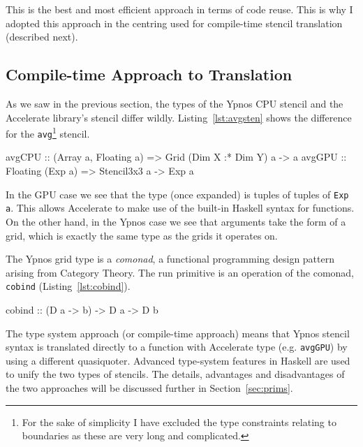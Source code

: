 \documentclass[
    12pt,
    a4paper,
    twoside,
    openright,
    ]{scrbook}
\begin{document}
This is the best and most efficient approach in terms of code reuse. This is why
I adopted this approach in the centring used for compile-time stencil
translation (described next).

\subsection{Compile-time Approach to Translation}
\label{sec:typesysapp}

As we saw in the previous section, the types of the Ypnos CPU stencil and the
Accelerate library's stencil differ wildly. Listing~\ref{lst:avgsten} shows the
difference for the \texttt{avg}\footnote{For the sake of simplicity I have
  excluded the type constraints relating to boundaries as these are very long
  and complicated.}  stencil.

\begin{hflisting}[label={lst:avgsten}, caption={The average function implemented
on both the CPU and GPU. Notice how the types differ. The constraints are
simplified.}]
avgCPU :: (Array a, Floating a) =>
          Grid (Dim X :* Dim Y) a -> a
avgGPU :: Floating (Exp a) =>
          Stencil3x3 a -> Exp a
\end{hflisting}

In the GPU case we see that the type (once expanded) is tuples of tuples of
\texttt{Exp a}. This allows Accelerate to make use of the built-in Haskell
syntax for functions. On the other hand, in the Ypnos case we see that arguments
take the form of a grid, which is exactly the same type as the grids it operates
on.

The Ypnos grid type is a \emph{comonad}, a functional programming design pattern
arising from Category Theory\cite{uustalu2008}. The run
primitive is an operation of the comonad, \texttt{cobind}
(Listing~\ref{lst:cobind}).

\begin{hflisting}[label={lst:cobind}, caption={The definition of cobind. Let
    \texttt{D} be a grid of a certain dimension and \texttt{a} and \texttt{b} be
    the types of that grid.}]
cobind :: (D a -> b) -> D a -> D b
\end{hflisting}

The type system approach (or compile-time approach) means that Ypnos stencil
syntax is translated directly to a function with Accelerate type
(e.g. \texttt{avgGPU}) by using a different quasiquoter. Advanced type-system
features in Haskell are used to unify the two types of stencils. The details,
advantages and disadvantages of the two approaches will be discussed further in
Section~\ref{sec:prims}.
\end{document}
